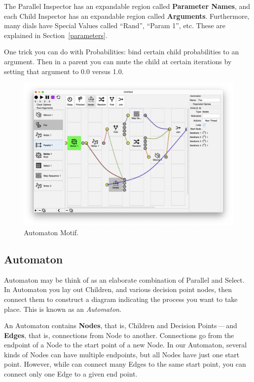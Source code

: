 \documentclass[twoside,10pt]{article}
\begin{document}
The Parallel Inspector has an expandable region called {\bf Parameter Names}, and each Child Inspector has an expandable region called {\bf Arguments}. Furthermore, many dials have Special Values called ``Rand'', ``Param 1'', etc.  These are explained in Section~\ref{parameters}.

One trick you can do with Probabilities: bind certain child probabilities to an argument.  Then in a parent you can mute the child at certain iterations by setting that argument to 0.0 versus 1.0.



\clearpage

\begin{figure}[t]
\centering
\includegraphics[width=6.5in]{Automaton}
\vspace{-2em}
\caption{Automaton Motif.}
\label{automaton}
\end{figure}

\subsection{Automaton}

Automaton may be think of as an elaborate combination of Parallel and Select.  In Automaton you lay out Children, and various decision point nodes, then connect them to construct a diagram indicating the process you want to take place.  This is known as an {\it Automaton}.  

An Automaton contains {\bf Nodes}, that is, Children and Decision Points\,---\,and {\bf Edges}, that is, connections from Node to another.  Connections go from the endpoint of a Node to the start point of a new Node.  In our Automaton, several kinds of Nodes can have multiple endpoints, but all Nodes have just one start point.  However, while can connect many Edges to the same start point, you can connect only one Edge to a given end point.
\end{document}

